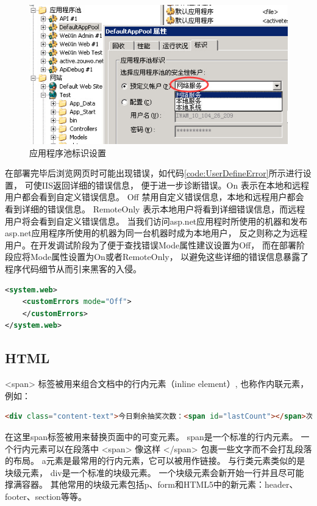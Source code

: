 \documentclass{book}
\begin{document}
\begin{figure}[htbp]
	\centering
	\includegraphics[scale=0.8]{AspNetAppPoolIdentitySetting.jpg}
	\caption{应用程序池标识设置}
	\label{fig:AspNetAppPoolIdentitySetting}
\end{figure}

在部署完毕后浏览网页时可能出现错误，如代码\ref{code:UserDefineError}所示进行设置，
可使IIS返回详细的错误信息，
便于进一步诊断错误。On 表示在本地和远程用户都会看到自定义错误信息。
Off 禁用自定义错误信息，本地和远程用户都会看到详细的错误信息。
RemoteOnly 表示本地用户将看到详细错误信息，而远程用户将会看到自定义错误信息。
当我们访问asp.net应用程时所使用的机器和发布asp.net应用程序所使用的机器为同一台机器时成为本地用户，
反之则称之为远程用户。在开发调试阶段为了便于查找错误Mode属性建议设置为Off，
而在部署阶段应将Mode属性设置为On或者RemoteOnly，
以避免这些详细的错误信息暴露了程序代码细节从而引来黑客的入侵。

\begin{lstlisting}[language=XML,caption=自定义错误设置,label={code:UserDefineError}]
<system.web>   
	<customErrors mode="Off">
	</customErrors> 
</system.web>
\end{lstlisting}

\subsection{HTML}

<span> 标签被用来组合文档中的行内元素（inline element）,
也称作内联元素，例如：

\begin{lstlisting}[language=HTML]
<div class="content-text">今日剩余抽奖次数：<span id="lastCount"></span>次</div>
\end{lstlisting}

在这里span标签被用来替换页面中的可变元素。
span是一个标准的行内元素。
一个行内元素可以在段落中 <span> 像这样 </span> 包裹一些文字而不会打乱段落的布局。 
a元素是最常用的行内元素，它可以被用作链接。
与行类元素类似的是块级元素，
div是一个标准的块级元素。
一个块级元素会新开始一行并且尽可能撑满容器。
其他常用的块级元素包括p、form和HTML5中的新元素：header、footer、section等等。 
\end{document}
